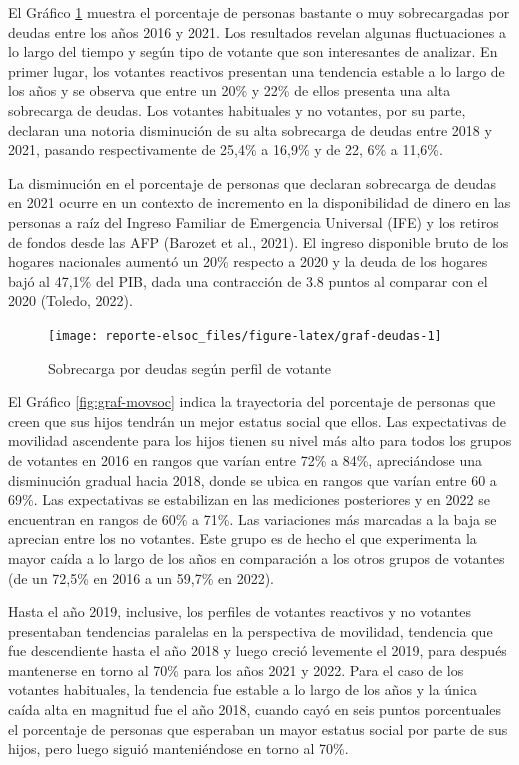 \documentclass[
  12pt,
]{book}
\begin{document}
El Gráfico \ref{fig:graf-deudas} muestra el porcentaje de personas bastante o muy sobrecargadas por deudas entre los años 2016 y 2021. Los resultados revelan algunas fluctuaciones a lo largo del tiempo y según tipo de votante que son interesantes de analizar. En primer lugar, los votantes reactivos presentan una tendencia estable a lo largo de los años y se observa que entre un 20\% y 22\% de ellos presenta una alta sobrecarga de deudas. Los votantes habituales y no votantes, por su parte, declaran una notoria disminución de su alta sobrecarga de deudas entre 2018 y 2021, pasando respectivamente de 25,4\% a 16,9\% y de 22, 6\% a 11,6\%.

La disminución en el porcentaje de personas que declaran sobrecarga de deudas en 2021 ocurre en un contexto de incremento en la disponibilidad de dinero en las personas a raíz del Ingreso Familiar de Emergencia Universal (IFE) y los retiros de fondos desde las AFP (Barozet et al., 2021). El ingreso disponible bruto de los hogares nacionales aumentó un 20\% respecto a 2020 y la deuda de los hogares bajó al 47,1\% del PIB, dada una contracción de 3.8 puntos al comparar con el 2020 (Toledo, 2022).

\begin{figure}

{\centering \texttt{[image: reporte-elsoc\_files/figure-latex/graf-deudas-1]} 

}

\caption{Sobrecarga por deudas según perfil de votante}\label{fig:graf-deudas}
\end{figure}

El Gráfico \ref{fig:graf-movsoc} indica la trayectoria del porcentaje de personas que creen que sus hijos tendrán un mejor estatus social que ellos. Las expectativas de movilidad ascendente para los hijos tienen su nivel más alto para todos los grupos de votantes en 2016 en rangos que varían entre 72\% a 84\%, apreciándose una disminución gradual hacia 2018, donde se ubica en rangos que varían entre 60 a 69\%. Las expectativas se estabilizan en las mediciones posteriores y en 2022 se encuentran en rangos de 60\% a 71\%. Las variaciones más marcadas a la baja se aprecian entre los no votantes. Este grupo es de hecho el que experimenta la mayor caída a lo largo de los años en comparación a los otros grupos de votantes (de un 72,5\% en 2016 a un 59,7\% en 2022).

Hasta el año 2019, inclusive, los perfiles de votantes reactivos y no votantes presentaban tendencias paralelas en la perspectiva de movilidad, tendencia que fue descendiente hasta el año 2018 y luego creció levemente el 2019, para después mantenerse en torno al 70\% para los años 2021 y 2022. Para el caso de los votantes habituales, la tendencia fue estable a lo largo de los años y la única caída alta en magnitud fue el año 2018, cuando cayó en seis puntos porcentuales el porcentaje de personas que esperaban un mayor estatus social por parte de sus hijos, pero luego siguió manteniéndose en torno al 70\%.
\end{document}
